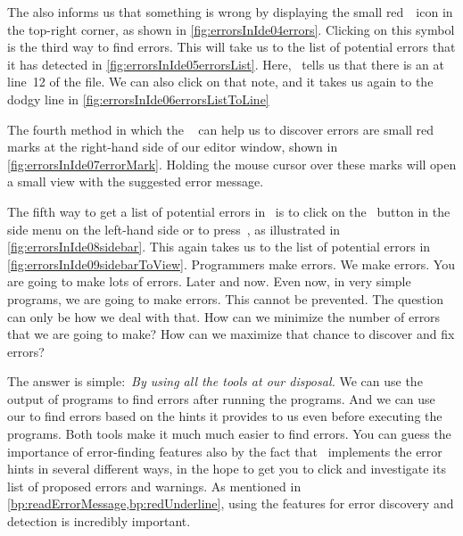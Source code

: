 The  also informs us that something is wrong by displaying the small red~\pycharmErrorsSymbol~icon in the top-right corner, as shown in \cref{fig:errorsInIde04errors}.
Clicking on this symbol is the third way to find errors.
This will take us to the list of potential errors that it has detected in \cref{fig:errorsInIde05errorsList}.
Here, \pycharm\ tells us that there is an \emph{} at line~12 of the file.
We can also click on that note, and  it takes us again to the dodgy line in \cref{fig:errorsInIde06errorsListToLine}

The fourth method in which the \pycharm\  can help us to discover errors are small red marks at the right-hand side of our editor window, shown in \cref{fig:errorsInIde07errorMark}.
Holding the mouse cursor over these marks will open a small view with the suggested error message.

The fifth way to get a list of potential errors in \pycharm\ is to click on the \pycharmErrorsButton~button in the side menu on the left-hand side or to press~, as illustrated in \cref{fig:errorsInIde08sidebar}.
This again takes us to the list of potential errors in \cref{fig:errorsInIde09sidebarToView}.
%
%
\endhsection%
%
%
%
Programmers make errors.
We make errors.
You are going to make lots of errors.
Later and now.
Even now, in very simple programs, we are going to make errors.
This cannot be prevented.
The question can only be how we deal with that.
How can we minimize the number of errors that we are going to make?
How can we maximize that chance to discover and fix errors?

The answer is simple:~\emph{By using all the tools at our disposal.}
We can use the output of programs to find errors after running the programs.
And we can use our  to find errors based on the hints it provides to us even before executing the programs.
Both tools make it much much easier to find errors.
You can guess the importance of error-finding features also by the fact that \pycharm\ implements the error hints in several different ways, in the hope to get you to click and investigate its list of proposed errors and warnings.
As mentioned in \cref{bp:readErrorMessage,bp:redUnderline}, using the  features for error discovery and detection is incredibly important.

